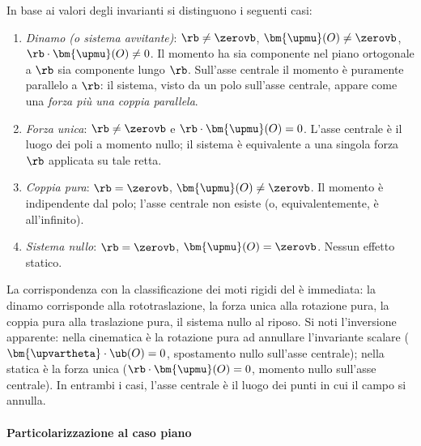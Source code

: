In base ai valori degli invarianti si distinguono i seguenti
casi:
\begin{enumerate}[label=(\roman*)]
	\item \textit{Dinamo (o sistema avvitante)}:
	$\rb \neq \zerovb$,
	$\bm{\upmu}(O) \neq \zerovb$,
	$\rb \cdot \bm{\upmu}(O) \neq 0$. Il momento ha sia
	componente nel piano ortogonale a $\rb$ sia componente
	lungo $\rb$. Sull'asse centrale il momento è puramente
	parallelo a $\rb$: il sistema, visto da un polo sull'asse
	centrale, appare come una \textit{forza più una coppia
		parallela}.
	\item \textit{Forza unica}:
	$\rb \neq \zerovb$ e
	$\rb \cdot \bm{\upmu}(O) = 0$. L'asse centrale è il luogo
	dei poli a momento nullo; il sistema è equivalente a una
	singola forza $\rb$ applicata su tale retta.
	\item \textit{Coppia pura}:
	$\rb = \zerovb$, $\bm{\upmu}(O) \neq \zerovb$. Il momento
	è indipendente dal polo; l'asse centrale non esiste (o,
	equivalentemente, è all'infinito).
	\item \textit{Sistema nullo}: $\rb = \zerovb$,
	$\bm{\upmu}(O) = \zerovb$. Nessun effetto statico.
\end{enumerate}

\begin{oss}
	La corrispondenza con la classificazione dei moti rigidi
	del  è immediata: la dinamo corrisponde alla
	rototraslazione, la forza unica alla rotazione pura, la
	coppia pura alla traslazione pura, il sistema nullo al
	riposo. Si noti l'inversione apparente: nella cinematica è
	la rotazione pura ad annullare l'invariante scalare
	($\bm{\upvartheta} \cdot \ub(O) = 0$, spostamento nullo
	sull'asse centrale); nella statica è la forza unica
	($\rb \cdot \bm{\upmu}(O) = 0$, momento nullo sull'asse
	centrale). In entrambi i casi, l'asse centrale è il luogo
	dei punti in cui il campo si annulla.
\end{oss}

\paragraph{Particolarizzazione al caso piano}	\label{sec:caso_piano_F}


